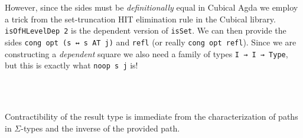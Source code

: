 However, since the sides must be \emph{definitionally} equal in Cubical Agda we employ
a trick from the set-truncation HIT elimination rule in the Cubical library. \texttt{isOfHLevelDep 2}
is the dependent version of \texttt{isSet}. We can then provide the sides
\texttt{cong opt (s ↔ s AT j)} and \texttt{refl} (or really \texttt{cong opt refl}). Since we are
constructing a \emph{dependent} square we also need a family of types \texttt{I → I → Type}, but this
is exactly what \texttt{noop s j} is!
\begin{code}%
\>[0]\AgdaSpace{}%
\AgdaSymbol{(}\AgdaSpace{}%
\AgdaSpace{}%
\AgdaSpace{}%
\AgdaSpace{}%
\AgdaSymbol{)}\AgdaSpace{}%
\AgdaSymbol{=}\AgdaSpace{}%
\AgdaSpace{}%
\<%
\\
\>[0][@{}l@{\AgdaIndent{0}}]%
\>[2]\AgdaSymbol{(}\AgdaSpace{}%
\AgdaSpace{}%
\AgdaSpace{}%
\AgdaSpace{}%
\AgdaSymbol{)}\<%
\\
%
\>[2]\AgdaSymbol{\AgdaUnderscore{}}\AgdaSpace{}%
\AgdaSymbol{\AgdaUnderscore{}}\AgdaSpace{}%
\AgdaSymbol{(}\AgdaSpace{}%
\AgdaSpace{}%
\AgdaSymbol{(}\AgdaSpace{}%
\AgdaSpace{}%
\AgdaSpace{}%
\AgdaSpace{}%
\AgdaSymbol{))}\AgdaSpace{}%
\AgdaSpace{}%
\AgdaSymbol{(}\AgdaSpace{}%
\AgdaSpace{}%
\AgdaSymbol{)}\AgdaSpace{}%
\AgdaSpace{}%
\<%
\end{code}
\begin{code}[hide]%
%
\>[2]\<%
\end{code}
Contractibility of the result type is immediate from the characterization of paths
in $\Sigma$-types and the inverse of the provided path.
